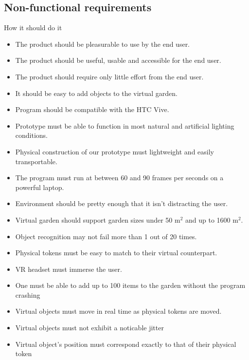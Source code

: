 				\subsection{Non-functional requirements}
					How it should do it\\
					\begin{itemize}
						\item The product should be pleasurable to use by the end user.
						\item The product should be useful, usable and accessible for the end user.
						\item The product should require only little effort from the end user.
						\item It should be easy to add objects to the virtual garden.
						\item Program should be compatible with the HTC Vive.
						\item Prototype must be able to function in most natural and artificial lighting conditions.
						\item Physical construction of our prototype must lightweight and easily transportable.
						\item The program must run at between 60 and 90 frames per seconds on a powerful laptop.
						\item Environment should be pretty enough that it isn't distracting the user. 
						\item Virtual garden should support garden sizes under 50 m$^2$ and up to 1600 m$^2$.
						\item Object recognition may not fail more than 1 out of 20 times.
						\item Physical tokens must be easy to match to their virtual counterpart.
						\item VR headset must immerse the user.
						\item One must be able to add up to 100 items to the garden without the program crashing
						\item Virtual objects must move in real time as physical tokens are moved.
						\item Virtual objects must not exhibit a noticable jitter
						\item Virtual object's position must correspond exactly to that of their physical token
					\end{itemize}
			